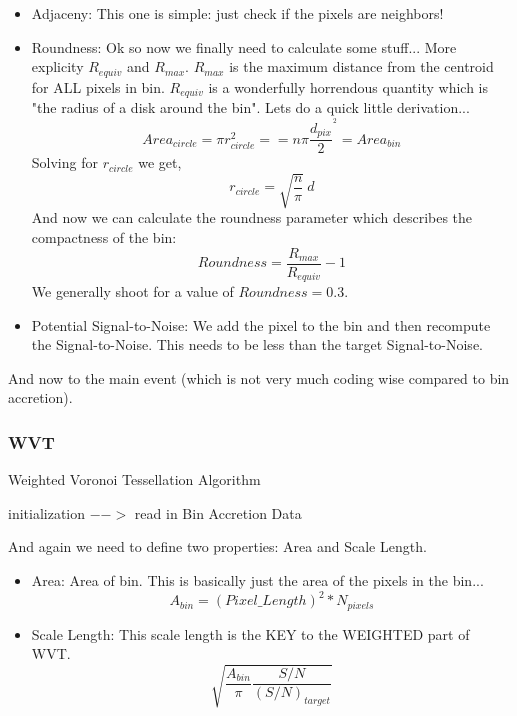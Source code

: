\documentclass[11pt,letterpaper]{article}
\begin{document}
\begin{itemize}
	\item Adjaceny: This one is simple: just check if the pixels are neighbors!
	\item Roundness: Ok so now we finally need to calculate some stuff... More explicity $R_{equiv}$ and $R_{max}$. $R_{max}$ is the maximum distance from the centroid for ALL pixels in bin. $R_{equiv}$ is a wonderfully horrendous quantity which is "the radius of a disk around the bin". Lets do a quick little derivation...
	\begin{equation}
		Area_{circle} = \pi r_{circle}^2 == n\pi\frac{d_{pix}}{2}^^2 = Area_{bin}
	\end{equation} 
	Solving for $r_{circle}$ we get,
	\begin{equation}
		r_{circle} = \sqrt{\frac{n}{\pi}} \ d
	\end{equation}
	And now we can calculate the roundness parameter which describes the compactness of the bin:
	\begin{equation}
		Roundness = \frac{R_{max}}{R_{equiv}} - 1
	\end{equation}
	We generally shoot for a value of $Roundness = 0.3$.
	\item Potential Signal-to-Noise: We add the pixel to the bin and then recompute the Signal-to-Noise. This needs to be less than the target Signal-to-Noise.
\end{itemize}

And now to the main event (which is not very much coding wise compared to bin accretion).

\subsubsection{WVT}
\begin{algorithm}[H]\label{algo:BA}
	\caption{Weighted Voronoi Tessellation Algorithm}
	initialization $-->$ read in Bin Accretion Data\;
\end{algorithm}
And again we need to define two properties: Area and Scale Length.
\begin{itemize}
	\item Area: Area of bin. This is basically just the area of the pixels in the bin...
	\begin{equation}
		A_{bin} = (Pixel\_Length)^2*N_{pixels} 
	\end{equation}
	\item Scale Length: This scale length is the KEY to the WEIGHTED part of WVT.
	\begin{equation}
		\sqrt{\frac{A_{bin}}{\pi}\frac{S/N}{(S/N)_{target}}}
	\end{equation}
\end{itemize}
\end{document}
